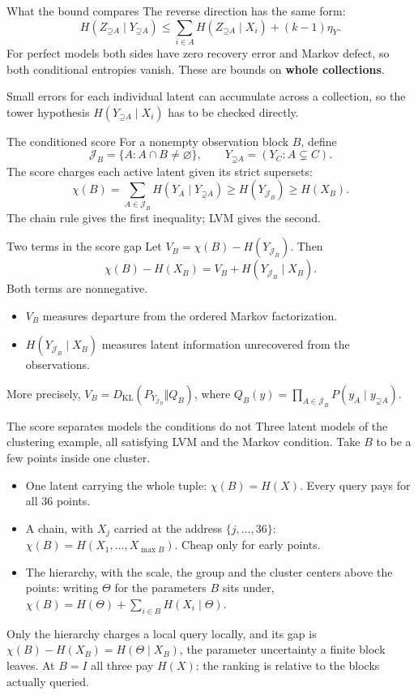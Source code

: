 \documentclass[aspectratio=169,12pt]{beamer}
\newcommand{\Up}{\mathord{\supseteq}}
\newcommand{\Upstrict}{\mathord{\supsetneq}}
\begin{document}
\begin{frame}{What the bound compares}
The reverse direction has the same form:
\[
H(Z_{\Up A}\mid Y_{\Up A})
\le\sum_{i\in A}H(Z_{\Up A}\mid X_i)+(k-1)\eta_Y.
\]
For perfect models both sides have zero recovery error and Markov defect,
so both conditional entropies vanish. These are bounds on \textbf{whole collections}.
\medskip

Small errors for each individual latent can accumulate across a collection, so
the tower hypothesis $H(Y_{\Up A}\mid X_i)$ has to be checked directly.
\end{frame}

\begin{frame}{The conditioned score}
For a nonempty observation block $B$, define
\[
\mathcal J_B=\{A:A\cap B\ne\varnothing\},\qquad Y_{\Upstrict A}=(Y_C:A\subsetneq C).
\]
The score charges each active latent given its strict supersets:
\[
\chi(B)=\sum_{A\in\mathcal J_B}H(Y_A\mid Y_{\Upstrict A})
\ge H(Y_{\mathcal J_B})\ge H(X_B).
\]
The chain rule gives the first inequality; LVM gives the second.
\end{frame}

\begin{frame}{Two terms in the score gap}
Let $V_B=\chi(B)-H(Y_{\mathcal J_B})$. Then
\[
\chi(B)-H(X_B)=V_B+H(Y_{\mathcal J_B}\mid X_B).
\]
Both terms are nonnegative.
\begin{itemize}
\item $V_B$ measures departure from the ordered Markov factorization.
\item $H(Y_{\mathcal J_B}\mid X_B)$ measures latent information unrecovered
from the observations.
\end{itemize}
\medskip
\small More precisely, $V_B=D_{\mathrm{KL}}(P_{Y_{\mathcal J_B}}\Vert Q_B)$,
where $Q_B(y)=\prod_{A\in\mathcal J_B}P(y_A\mid y_{\Upstrict A})$.
\end{frame}

\begin{frame}{The score separates models the conditions do not}
Three latent models of the clustering example, all satisfying LVM and the
Markov condition. Take $B$ to be a few points inside one cluster.
\begin{itemize}
\item One latent carrying the whole tuple: $\chi(B)=H(X)$. Every query pays
for all 36 points.
\item A chain, with $X_j$ carried at the address $\{j,\ldots,36\}$:
$\chi(B)=H(X_1,\ldots,X_{\max B})$. Cheap only for early points.
\item The hierarchy, with the scale, the group and the cluster centers above
the points: writing $\Theta$ for the parameters $B$ sits under,
$\chi(B)=H(\Theta)+\sum_{i\in B}H(X_i\mid\Theta)$.
\end{itemize}
Only the hierarchy charges a local query locally, and its gap is
$\chi(B)-H(X_B)=H(\Theta\mid X_B)$, the parameter uncertainty a finite block
leaves. At $B=I$ all three pay $H(X)$: the ranking is relative to the blocks
actually queried.
\end{frame}
\end{document}
